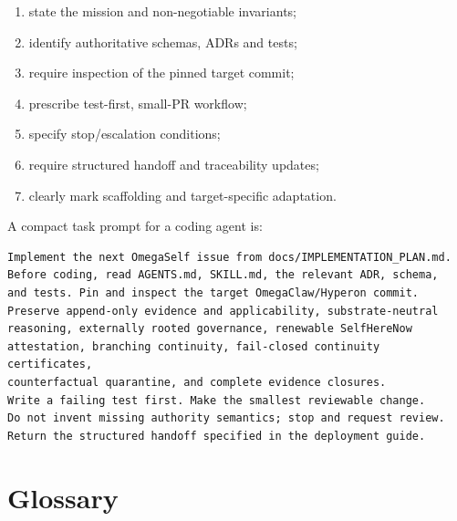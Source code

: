 \documentclass[11pt,oneside]{report}
\begin{document}
\begin{enumerate}
  \item state the mission and non-negotiable invariants;
  \item identify authoritative schemas, ADRs and tests;
  \item require inspection of the pinned target commit;
  \item prescribe test-first, small-PR workflow;
  \item specify stop/escalation conditions;
  \item require structured handoff and traceability updates;
  \item clearly mark scaffolding and target-specific adaptation.
\end{enumerate}

A compact task prompt for a coding agent is:

\begin{lstlisting}[caption={Reusable coding-agent task prompt}]
Implement the next OmegaSelf issue from docs/IMPLEMENTATION_PLAN.md.
Before coding, read AGENTS.md, SKILL.md, the relevant ADR, schema,
and tests. Pin and inspect the target OmegaClaw/Hyperon commit.
Preserve append-only evidence and applicability, substrate-neutral
reasoning, externally rooted governance, renewable SelfHereNow
attestation, branching continuity, fail-closed continuity certificates,
counterfactual quarantine, and complete evidence closures.
Write a failing test first. Make the smallest reviewable change.
Do not invent missing authority semantics; stop and request review.
Return the structured handoff specified in the deployment guide.
\end{lstlisting}

\chapter{Glossary}
\end{document}
